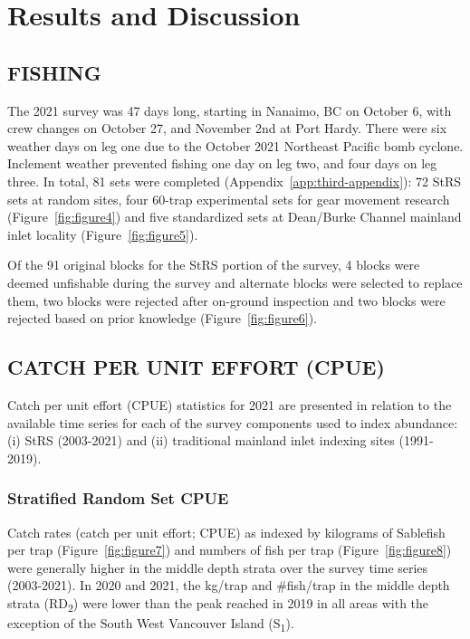 \documentclass[12pt]{article}\usepackage[]{graphicx}\usepackage[]{color}
\begin{document}
\hypertarget{results-and-discussion}{%
\section{Results and Discussion}\label{results-and-discussion}}

\hypertarget{fishing}{%
\subsection{FISHING}\label{fishing}}

The 2021 survey was 47 days long, starting in Nanaimo, BC on October 6, with crew changes on October 27, and November 2nd at Port Hardy. There were six weather days on leg one due to the October 2021 Northeast Pacific bomb cyclone. Inclement weather prevented fishing one day on leg two, and four days on leg three. In total, 81 sets were completed (Appendix~\ref{app:third-appendix}): 72 StRS sets at random sites, four 60-trap experimental sets for gear movement research (Figure~\ref{fig:figure4}) and five standardized sets at Dean/Burke Channel mainland inlet locality (Figure~\ref{fig:figure5}).

Of the 91 original blocks for the StRS portion of the survey, 4 blocks were deemed unfishable during the survey and alternate blocks were selected to replace them, two blocks were rejected after on-ground inspection and two blocks were rejected based on prior knowledge (Figure~\ref{fig:figure6}).

\hypertarget{catch-per-unit-effort-cpue}{%
\subsection{CATCH PER UNIT EFFORT (CPUE)}\label{catch-per-unit-effort-cpue}}

Catch per unit effort (CPUE) statistics for 2021 are presented in relation to the available time series for each of the survey components used to index abundance: (i) StRS (2003-2021) and (ii) traditional mainland inlet indexing sites (1991-2019).

\hypertarget{stratified-random-set-cpue}{%
\subsubsection{Stratified Random Set CPUE}\label{stratified-random-set-cpue}}

Catch rates (catch per unit effort; CPUE) as indexed by kilograms of Sablefish per trap (Figure~\ref{fig:figure7}) and numbers of fish per trap (Figure~\ref{fig:figure8}) were generally higher in the middle depth strata over the survey time series (2003-2021). In 2020 and 2021, the kg/trap and \#fish/trap in the middle depth strata (RD\textsubscript{2}) were lower than the peak reached in 2019 in all areas with the exception of the South West Vancouver Island (S\textsubscript{1}).
\end{document}
